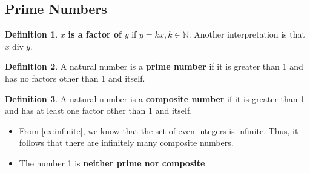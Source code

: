 \documentclass[article, 12pt]{article}
\theoremstyle{definition}
\newtheorem{definition}{Definition}[subsection]
\newcommand{\Div}[1]{\;\mathrm{div}\; #1} %
\newcommand{\nats}{\mathbb{N}}
\begin{document}
    \subsection{Prime Numbers}
    \begin{definition}
        $x$ \textbf{is a factor of} $y$ if $y=kx, k \in \nats$. Another interpretation is that $x \Div{y}$.
    \end{definition}
    \begin{definition}
        A natural number is a \textbf{prime number} if it is greater than 1 and has no factors other than 1 and itself.
    \end{definition}
    \begin{definition}
        A natural number is a \textbf{composite number} if it is greater than 1 and has at least one factor other than 1 and itself.
    \end{definition}
    \begin{itemize}
        \item From \ref{ex:infinite}, we know that the set of even integers is infinite. Thus, it follows that there are infinitely many composite numbers.
        \item The number 1 is \textbf{neither prime nor composite}.
    \end{itemize}
\end{document}
